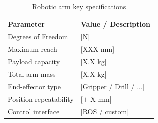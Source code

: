 \begin{table}[H]
    \centering
    \caption{Robotic arm key specifications}
    \label{tab:arm_specs}
    \begin{tabular}{L{5cm} L{7cm}}
        \toprule
        \textbf{Parameter}     & \textbf{Value / Description} \\
        \midrule
        Degrees of Freedom     & [N] \\
        Maximum reach          & [XXX mm] \\
        Payload capacity       & [X.X kg] \\
        Total arm mass         & [X.X kg] \\
        End-effector type      & [Gripper / Drill / ...] \\
        Position repeatability & [$\pm$ X mm] \\
        Control interface      & [ROS / custom] \\
        \bottomrule
    \end{tabular}
\end{table}
